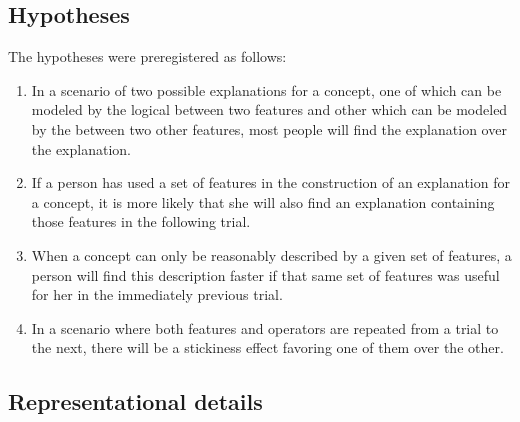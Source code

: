 \subsection{Hypotheses} \label{Hypotheses}
The hypotheses were preregistered as follows: 

\begin{enumerate}[label=\Roman*]
    \item\label{Hip:AndOverOr} In a scenario of two possible explanations for a concept, one of which can be modeled by the logical \AND between two features and other which can be modeled by the \OR between two other features, most people will find the \AND explanation over the \OR explanation.%
    \item\label{Hip:FeatureBiasStickiness} If a person has used a set of features in the construction of an explanation for a concept, it is more likely that she will also find an explanation containing those features %
    in the following trial. %
    \item \label{Hip:FeatureBiasTimeAdvantage} When a concept can only be reasonably described by a given set of features, a person will find this description faster if that same set of features was useful for her in the immediately previous trial.
    \item\label{Hip:StickinessFeatureOperator} In a scenario where both features and operators are repeated from a trial to the next, there will be a stickiness effect favoring one of them over the other.%
\end{enumerate}


\subsection{Representational details}\label{sub:experimentdetails} 

